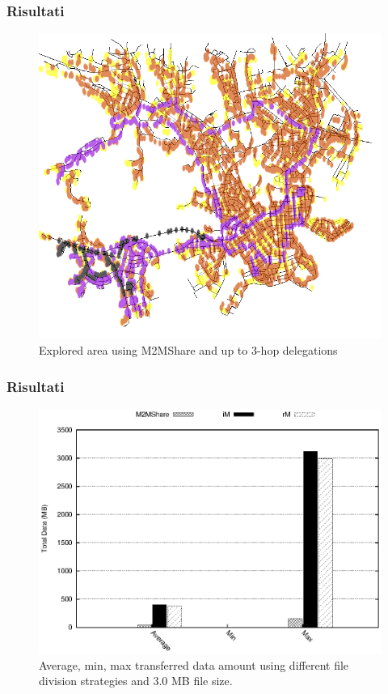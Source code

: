 \documentclass{beamer}
\begin{document}
\begin{frame}
\frametitle{Risultati}
\begin{center}
\begin{figure}[ht]
\includegraphics[scale=0.25]{../figure/mappa_3_hop.png}
    \caption{Explored area using M2MShare and up to 3-hop delegations}
\end{figure}
\end{center}
\end{frame}

\begin{frame}
\frametitle{Risultati}
\begin{center}
\begin{figure}[ht]
\includegraphics[scale=0.7]{../grafici/dataDFS_3MB.eps}
\caption{Average, min, max transferred data amount using different file division strategies and 3.0 MB file size.}
\end{figure}
\end{center}
\end{frame}
\end{document}
